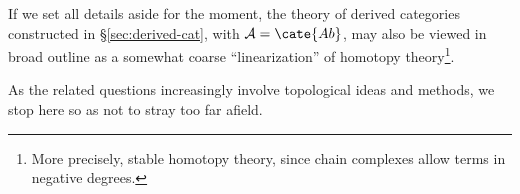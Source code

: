 If we set all details aside for the moment, the theory of derived categories
constructed in \S\ref{sec:derived-cat}, with $\mathcal{A}=\cate{Ab}$, may
also be viewed in broad outline as a somewhat coarse ``linearization'' of
homotopy theory\footnote{More precisely, stable homotopy theory, since chain
complexes allow terms in negative degrees.}.

As the related questions increasingly involve topological ideas and methods,
we stop here so as not to stray too far afield.
